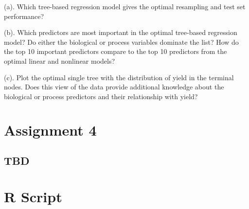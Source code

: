 \documentclass[]{report}
\begin{document}
\begin{subquestion}{(a).} Which tree-based regression model gives the optimal resampling and test set performance? \end{subquestion}

\begin{subquestion}{(b).} Which predictors are most important in the optimal tree-based regression model? Do either the biological or process variables dominate the list? How do the top 10 important predictors compare to the top 10 predictors from the optimal linear and nonlinear models?\end{subquestion}

\begin{subquestion}{(c).} Plot the optimal single tree with the distribution of yield in the terminal nodes. Does this view of the data provide additional knowledge about the biological or process predictors and their relationship with yield?\end{subquestion}

\hypertarget{AS-4}{%
\chapter*{Assignment 4}\label{AS-4}}

\hypertarget{tbd}{%
\section{TBD}\label{tbd}}

\hypertarget{R-Script}{%
\chapter*{R Script}\label{R-Script}}
\end{document}
